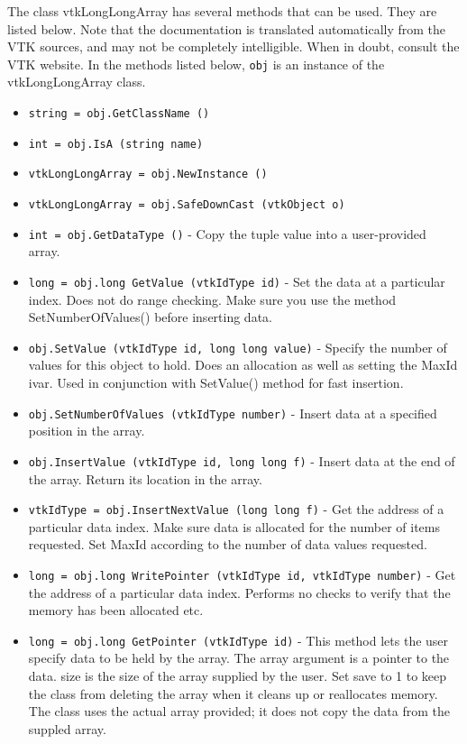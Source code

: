 The class vtkLongLongArray has several methods that can be used.
  They are listed below.
Note that the documentation is translated automatically from the VTK sources,
and may not be completely intelligible.  When in doubt, consult the VTK website.
In the methods listed below, \verb|obj| is an instance of the vtkLongLongArray class.
\begin{itemize}
\item  \verb|string = obj.GetClassName ()|

\item  \verb|int = obj.IsA (string name)|

\item  \verb|vtkLongLongArray = obj.NewInstance ()|

\item  \verb|vtkLongLongArray = obj.SafeDownCast (vtkObject o)|

\item  \verb|int = obj.GetDataType ()| -  Copy the tuple value into a user-provided array.

\item  \verb|long = obj.long GetValue (vtkIdType id)| -  Set the data at a particular index. Does not do range checking. Make sure
 you use the method SetNumberOfValues() before inserting data.

\item  \verb|obj.SetValue (vtkIdType id, long long value)| -  Specify the number of values for this object to hold. Does an
 allocation as well as setting the MaxId ivar. Used in conjunction with
 SetValue() method for fast insertion.

\item  \verb|obj.SetNumberOfValues (vtkIdType number)| -  Insert data at a specified position in the array.

\item  \verb|obj.InsertValue (vtkIdType id, long long f)| -  Insert data at the end of the array. Return its location in the array.

\item  \verb|vtkIdType = obj.InsertNextValue (long long f)| -  Get the address of a particular data index. Make sure data is allocated
 for the number of items requested. Set MaxId according to the number of
 data values requested.

\item  \verb|long = obj.long WritePointer (vtkIdType id, vtkIdType number)| -  Get the address of a particular data index. Performs no checks
 to verify that the memory has been allocated etc.

\item  \verb|long = obj.long GetPointer (vtkIdType id)| -  This method lets the user specify data to be held by the array.  The
 array argument is a pointer to the data.  size is the size of
 the array supplied by the user.  Set save to 1 to keep the class
 from deleting the array when it cleans up or reallocates memory.
 The class uses the actual array provided; it does not copy the data
 from the suppled array. 

\end{itemize}
